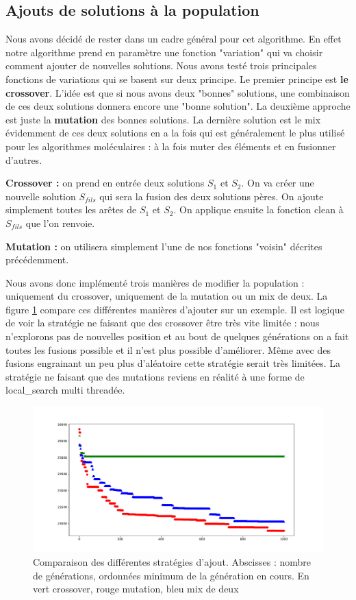 \documentclass[10pt,a4paper]{article}
\begin{document}
\subsection{Ajouts de solutions à la population }

Nous avons décidé de rester dans un cadre général pour cet algorithme. En effet notre algorithme prend en paramètre une fonction "variation" qui va choisir comment ajouter de nouvelles solutions. Nous avons testé trois principales fonctions de variations qui se basent sur deux principe. Le premier principe est \textbf{le crossover}. L'idée est que si nous avons deux "bonnes" solutions, une combinaison de ces deux solutions donnera encore une "bonne solution". La deuxième approche est juste la \textbf{mutation} des bonnes solutions. La dernière solution est le mix évidemment de ces deux solutions en a la fois qui est généralement le plus utilisé pour les algorithmes moléculaires : à la fois muter des éléments et en fusionner d'autres.



\textbf{Crossover : } on prend en entrée deux solutions $S_1$ et $S_2$. On va créer une nouvelle solution $S_{fils}$ qui sera la fusion des deux solutions pères. On ajoute simplement toutes les arêtes de $S_1$ et $S_2$. On applique ensuite la fonction clean à $S_{fils}$ que l'on renvoie.

\textbf{Mutation : } on utilisera simplement l'une de nos fonctions "voisin" décrites précédemment.


Nous avons donc implémenté trois manières de modifier la population : uniquement du crossover, uniquement de la mutation ou un mix de deux. La figure \ref{compareajout} compare ces différentes manières d'ajouter sur un exemple. Il est logique de voir la stratégie ne faisant que des crossover être très vite limitée : nous n'explorons pas de nouvelles position et au bout de quelques générations on a fait toutes les fusions possible et il n'est plus possible d'améliorer. Même avec des fusions engrainant un peu plus d'aléatoire cette stratégie serait très limitées. La stratégie ne faisant que des mutations reviens en réalité à une forme de local\_search multi threadée.
\begin{figure}
\centering
\includegraphics[scale=.4]{images/comparaison_genetic_ajout.pdf}
\caption{Comparaison des différentes stratégies d'ajout. Abscisses : nombre de générations, ordonnées minimum de la génération en cours. 
En vert crossover, rouge mutation, bleu mix de deux}
\label{compareajout}
\end{figure}
\end{document}
